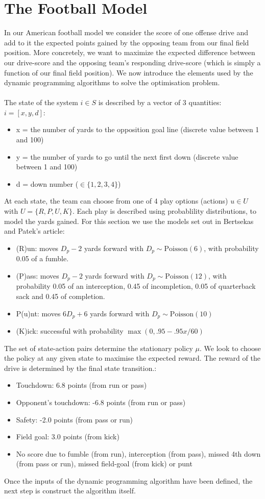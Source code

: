 \documentclass[11pt, oneside]{article}   	%
\begin{document}
\section{The Football Model}
In our American football model we consider the score of one offense drive and add to it the expected points gained by the opposing team from our final field position. More concretely, we want to maximize the expected difference between our drive-score and the opposing team's responding drive-score (which is simply a function of our final field position). We now introduce the elements used by the dynamic programming algorithms to solve the optimisation problem. \\\\
The state of the system $i \in S$ is described by a vector of 3 quantities: $i = [x,y,d]$:
\begin{itemize}
\item x = the number of yards to the opposition goal line (discrete value between 1 and 100)
\item y = the number of yards to go until the next first down (discrete value between 1 and 100)
\item d = down number ($\in \{1,2,3,4\}$)
\end{itemize}
At each state, the team can choose from one of 4 play options (actions) $u \in U$ with $U=\{R, P, U, K\}$. Each play is described using probablility distributions, to model the yards gained. For this section we use the models set out in Bertsekas and Patek's article:
\begin{itemize}
\item (R)un: moves $D_p - 2$ yards forward with $D_p \sim \text{Poisson}(6)$, with probability 0.05 of a fumble.
\item (P)ass: moves $D_p - 2$ yards forward with $D_p \sim \text{Poisson}(12)$, with probability 0.05 of an interception, 0.45 of incompletion, 0.05 of quarterback sack and 0.45 of completion. 
\item P(u)nt: moves $6 D_p  + 6$ yards forward with $D_p \sim \text{Poisson}(10)$ 
\item (K)ick: successful with probability $\max(0, .95 - .95x/60)$
\end{itemize}
The set of state-action pairs determine the stationary policy $\mu$. We look to choose the policy at any given state to maximise the expected reward. The reward of the drive is determined by the final state transition.:
\begin{itemize}
\item Touchdown: 6.8 points (from run or pass) 
\item Opponent's touchdown: -6.8 points (from run or pass)
\item Safety: -2.0 points (from pass or run)
\item Field goal: 3.0 points (from kick)
\item No score due to fumble (from run), interception (from pass), missed 4th down (from pass or run), missed field-goal (from kick) or punt
\end{itemize}
Once the inputs of the dynamic programming algorithm have been defined, the next step is construct the algorithm itself.
\end{document}
